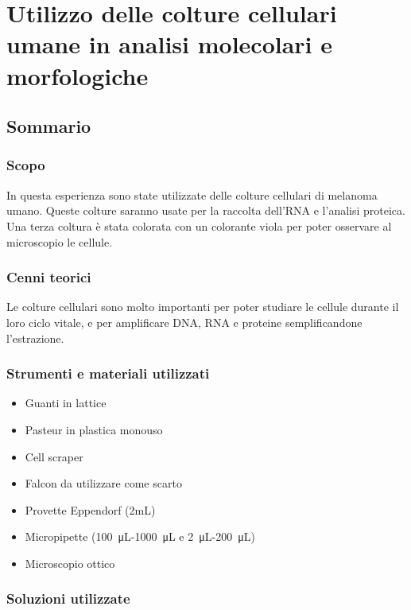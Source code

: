 \section{\LARGE{Utilizzo delle colture cellulari umane in analisi molecolari e morfologiche}}

\vspace{0.6cm}

\subsection{Sommario}

\subsubsection{Scopo}

In questa esperienza sono state utilizzate delle colture cellulari
di melanoma umano.
Queste colture saranno usate per la raccolta dell'RNA e l'analisi proteica.
Una terza coltura è stata colorata con un colorante viola per poter
osservare al microscopio le cellule.

\subsubsection{Cenni teorici}

Le colture cellulari sono molto importanti per poter studiare le cellule durante
il loro ciclo vitale, e per amplificare DNA, RNA e proteine semplificandone l'estrazione.

\subsubsection{Strumenti e materiali utilizzati}

\begin{itemize}
\item Guanti in lattice
\item Pasteur in plastica monouso
\item Cell scraper
\item Falcon da utilizzare come scarto
\item Provette Eppendorf (2mL)
\item Micropipette (\SI{100}{\micro\liter}-\SI{1000}{\micro\liter} e \SI{2}{\micro\liter}-\SI{200}{\micro\liter})
\item Microscopio ottico
\end{itemize}

\subsubsection{Soluzioni utilizzate}

